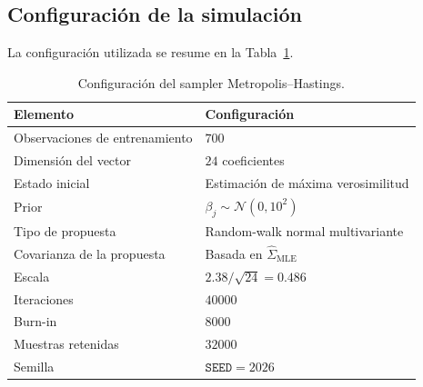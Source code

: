\subsection{Configuración de la simulación}

La configuración utilizada se resume en la
Tabla~\ref{tab:configuracion-mh}.

\begin{table}[H]
    \centering
    \caption{Configuración del sampler Metropolis--Hastings.}
    \label{tab:configuracion-mh}

    \begin{tabularx}{0.88\textwidth}{
        @{}
        >{\raggedright\arraybackslash}p{4.4cm}
        X
        @{}
    }
        \toprule
        Elemento & Configuración \\
        \midrule

        Observaciones de entrenamiento
        & \(700\) \\

        Dimensión del vector
        & \(24\) coeficientes \\

        Estado inicial
        & Estimación de máxima verosimilitud \\

        Prior
        & \(\beta_j\sim\mathcal{N}(0,10^2)\) \\

        Tipo de propuesta
        & Random-walk normal multivariante \\

        Covarianza de la propuesta
        & Basada en
          \(\widehat{\Sigma}_{\mathrm{MLE}}\) \\

        Escala
        & \(2.38/\sqrt{24}=0.486\) \\

        Iteraciones
        & \(\num{40000}\) \\

        Burn-in
        & \(\num{8000}\) \\

        Muestras retenidas
        & \(\num{32000}\) \\

        Semilla
        & \(\texttt{SEED}=2026\) \\

        \bottomrule
    \end{tabularx}
\end{table}

